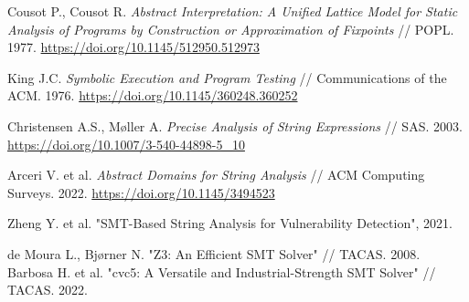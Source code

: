 
\newpage



\newpage



\newpage
\begin{thebibliography}{1}

 Cousot P., Cousot R. \emph{Abstract Interpretation: A Unified Lattice Model for Static Analysis of Programs by Construction or Approximation of Fixpoints} // POPL. 1977.  
\url{https://doi.org/10.1145/512950.512973}

 King J.C. \emph{Symbolic Execution and Program Testing} // Communications of the ACM. 1976.  
\url{https://doi.org/10.1145/360248.360252}

 Christensen A.S., Møller A. \emph{Precise Analysis of String Expressions} // SAS. 2003.  
\url{https://doi.org/10.1007/3-540-44898-5_10}

 Arceri V. et al. \emph{Abstract Domains for String Analysis} // ACM Computing Surveys. 2022.  
\url{https://doi.org/10.1145/3494523}

 Zheng Y. et al. "SMT-Based String Analysis for Vulnerability Detection", 2021.

 de Moura L., Bjørner N. "Z3: An Efficient SMT Solver" // TACAS. 2008.
 Barbosa H. et al. "cvc5: A Versatile and Industrial-Strength SMT Solver" // TACAS. 2022.

\end{thebibliography}
